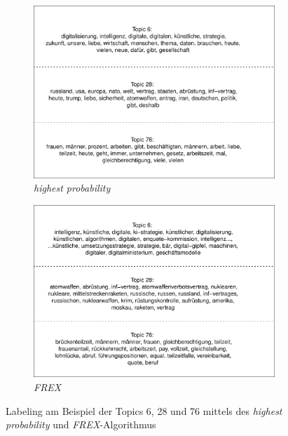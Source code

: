 \documentclass[12pt, 
    twoside=false, 
    bibliography=totoc, 
    numbers=endperiod, 
    headings=normal, 
    toc=chapterentrydotfill
    ]{scrbook}
\begin{document}
\begin{figure}
    \centering
    \begin{subfigure}{.5\textwidth}
      \centering
      \includegraphics[width=.9\linewidth]{document/images/stm_label_prob_example.pdf}
      \caption{\emph{highest probability}}
      \label{fig:sub1}
    \end{subfigure}%
    \begin{subfigure}{.5\textwidth}
      \centering
      \includegraphics[width=.9\linewidth]{document/images/stm_label_frex_example.pdf}
      \caption{\emph{FREX}}
      \label{fig:sub2}
    \end{subfigure}
    \caption[Labeling am Beispiel der Topics 6, 28 und 76 mittels des \emph{highest probability} und \emph{FREX}-Algorithmus]{Labeling am Beispiel der Topics 6, 28 und 76 mittels des \emph{highest probability} und \emph{FREX}-Algorithmus}
    \label{fig:example_labels}
\end{figure}
\end{document}
